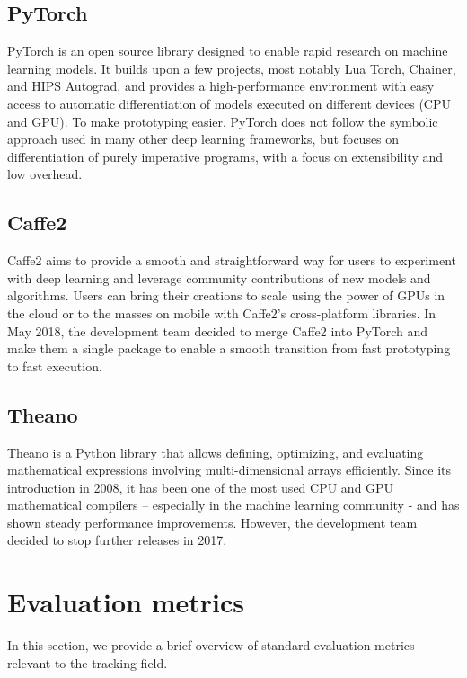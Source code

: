     \subsection{PyTorch}
        PyTorch \cite{paszke2017automatic} is an open source library designed to enable rapid research on machine learning models. It builds upon a few projects, most notably Lua Torch, Chainer, and HIPS Autograd, and provides a high-performance environment with easy access to automatic differentiation of models executed on different devices (CPU and GPU). To make prototyping easier, PyTorch does not follow the symbolic approach used in many other deep learning frameworks, but focuses on differentiation of purely imperative programs, with a focus on extensibility and low overhead. 
        
    \subsection{Caffe2}
        Caffe2 \cite{caffe2} aims to provide a smooth and straightforward way for users to experiment with deep learning and leverage community contributions of new models and algorithms. Users can bring their creations to scale using the power of GPUs in the cloud or to the masses on mobile with Caffe2's cross-platform libraries. In May 2018, the development team decided to merge Caffe2 into PyTorch and make them a single package to enable a smooth transition from fast prototyping to fast execution. 
        
    \subsection{Theano}
        Theano \cite{2016arXiv160502688short} is a Python library that allows defining, optimizing, and evaluating mathematical expressions involving multi-dimensional arrays efficiently. Since its introduction in 2008, it has been one of the most used CPU and GPU mathematical compilers – especially in the machine learning community - and has shown steady performance improvements. However, the development team decided to stop further releases in 2017. 
        
\section{Evaluation metrics} \label{evaluation-metrics}
    In this section, we provide a brief overview of standard evaluation metrics relevant to the tracking field.
    
